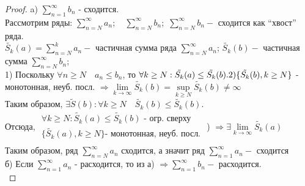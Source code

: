 \documentclass[14pt,a4paper]{scrartcl}
\theoremstyle{definition}
\theoremstyle{remark}
\theoremstyle{definition}
\theoremstyle{definition}
\begin{document}
\begin{proof}
  a) $ \sum\limits_{n = 1}^{ \infty}{b_n} $ - сходится.\\ Рассмотрим ряды:
  $ \sum\limits_{n = N}^{ \infty}{a_n};\quad  \sum\limits_{n = N}^{ \infty}{b_n};$ \quad
  $ \sum\limits_{n = N}^{ \infty}{b_n} -$ сходится как ``хвост'' ряда. \\
  $\tilde{S_k}(a) =  \sum\limits_{n = N}^{k}{a_n} - $ частичная сумма ряда $ \sum\limits_{n = N}^{ \infty}{a_n} $; $\tilde{S_k}(b) - $ частичная сумма $ \sum\limits_{n = N}^{ \infty}{b_n} $;\\
  1) Поскольку $\forall n \geq N \quad a_n\leq b_n$,
   то $\forall k\geq N :  \tilde{S_k}(a) \leq \tilde{S_k}(b). \\
   2) \lbrace \tilde{S_k}(b), k\geq N \rbrace $ - монотонная, неуб. посл. $\Longrightarrow  \lim\limits_{k\to  \infty}{\tilde{S_k}(b)} = \sup\limits_{k\geq  N}{\tilde{S_k}(b)} \neq \infty $\\
   Таким образом, $\exists \tilde{S}(b) : \forall k\geq N \quad \tilde{S_k}(b) \leq \tilde{S_k}(b).$\\
   Отсюда,
$  \begin{gathered}
 \forall k\geq N:  \tilde{S_k}(a) \leq \tilde{S_k}(b) \text{ - огр. сверху}\\
 \lbrace \tilde{S_k}(a), k\geq N \rbrace  \text{- монотонная, неуб. посл.}\\
   \end{gathered} $ \Bigg)
 $\Longrightarrow \exists  \lim\limits_{ k \to  \infty }{\tilde{S_k}(a)} $\\
 Таким образом, ряд $ \sum\limits_{n = N}^{ \infty}{a_n} $ сходится, а значит ряд $ \sum\limits_{n = 1}^{ \infty}{a_n} - $ сходится\\
 б) Если $ \sum\limits_{n = 1}^{ \infty}{a_n} $ - расходится, то из а) $\Longrightarrow  \sum\limits_{n = 1}^{ \infty}{b_n} - $ расходится.\\

\end{proof}
\end{document}
